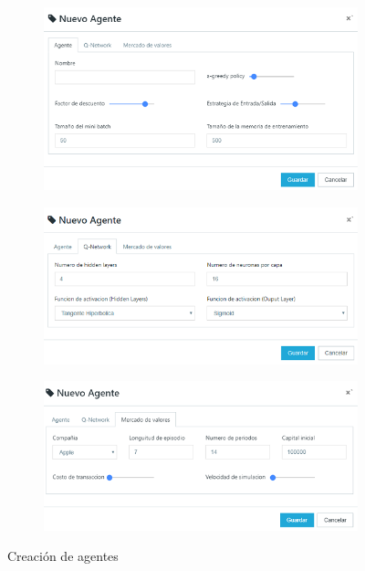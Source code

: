 \begin{figure}[h!]
	 \begin{subfigure}[b]{0.33\textwidth}
		\centering
		\includegraphics[scale=0.5]{imagenes/screen1.png}
	\end{subfigure}%
	
	 \begin{subfigure}[b]{0.33\textwidth}
		\centering
		\includegraphics[scale=0.5]{imagenes/screen2.png}
	\end{subfigure}

	 \begin{subfigure}[b]{0.33\textwidth}
		\centering
		\includegraphics[scale=0.5]{imagenes/screen3.png}
	\end{subfigure}
	
	\caption{Creación de agentes}
	\label{fig:cap4:2}	
\end{figure}


